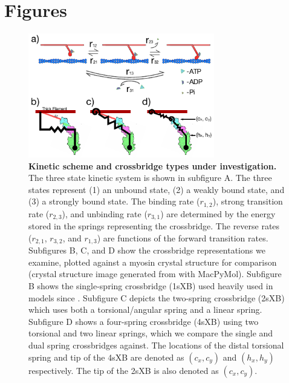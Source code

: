 \documentclass[]{article}
\begin{document}


\clearpage
\section*{Figures} %

\begin{figure}[htbp]
    \begin{center}
    \includegraphics[width=3.2in]{../imgs/Figure1.pdf}
    \caption{
        \label{fig_xb_types}
        \textbf{Kinetic scheme and crossbridge types under investigation.} 
        The three state kinetic system is shown in subfigure A. 
        The three states represent (1) an unbound state, (2) a weakly bound state, and (3) a strongly bound state. 
        The binding rate ($r_{1,2}$), strong transition rate ($r_{2,3}$), and unbinding rate ($r_{3,1}$) are determined by the energy stored in the springs representing the crossbridge. 
        The reverse rates ($r_{2,1}$, $r_{3,2}$, and $r_{1,3}$) are functions of the forward transition rates.
        Subfigures B, C, and D show the crossbridge representations we examine, plotted against a myosin crystal structure for comparison (crystal structure image generated from \citet{Gourinath2003} with MacPyMol). 
        Subfigure B shows the single-spring crossbridge (1sXB) used heavily used in models since \protect\citep{Huxley1957}. 
        Subfigure C depicts the two-spring crossbridge (2sXB) which uses both a torsional/angular spring and a linear spring. 
        Subfigure D shows a four-spring crossbridge (4sXB) using two torsional and two linear springs, which we compare the single and dual spring crossbridges against. 
        The locations of the distal torsional spring and tip of the 4sXB are denoted as $(c_x, c_y)$ and $(h_x, h_y)$ respectively. 
        The tip of the 2sXB is also denoted as $(c_x, c_y)$.
    }
    \end{center}
\end{figure}
\end{document}
